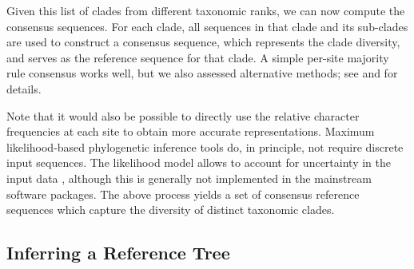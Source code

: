 Given this list of clades from different taxonomic ranks, we can now compute the consensus sequences.
For each clade, all sequences in that clade and its sub-clades are used to construct a consensus sequence,
which represents the clade diversity, and serves as the reference sequence for that clade.
A simple per-site majority rule consensus \cite{May1952,Day1992a} works well,
but we also assessed alternative methods;
see  and  for details.

Note that it would also be possible to directly use the relative character frequencies at each site
to obtain more accurate representations.
Maximum likelihood-based phylogenetic inference tools do, in principle, not require discrete input sequences.
The likelihood model allows to account for uncertainty in the input data \cite{Felsenstein2004},
although this is generally not implemented in the mainstream software packages.
The above process yields a set of consensus reference sequences which capture the diversity of distinct taxonomic clades.


\subsection{Inferring a Reference Tree}
\label{ch:AutomaticTrees:sec:Method:sub:ReferenceTrees}

